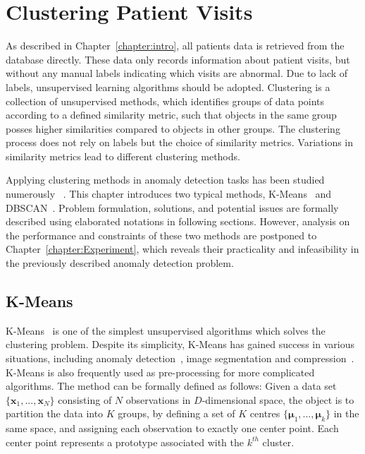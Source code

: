 \chapter{Clustering Patient Visits}
\label{chapter:clustering}

As described in Chapter~\ref{chapter:intro}, all patients data is retrieved from the database directly. These data only records information about patient visits, but without any manual labels indicating which visits are abnormal. Due to lack of labels, unsupervised learning algorithms should be adopted. Clustering is a collection of unsupervised methods, which identifies groups of data points according to a defined similarity metric, such that objects in the same group posses higher similarities compared to objects in other groups. The clustering process does not rely on labels but the choice of similarity metrics. Variations in similarity metrics lead to different clustering methods.

Applying clustering methods in anomaly detection tasks has been studied numerously~\cite{he2003discovering}
. This chapter introduces two typical methods, K-Means~\cite{lloyd1982least} and DBSCAN~\cite{ester1996density}. Problem formulation, solutions, and potential issues are formally described using elaborated notations in following sections. However, analysis on the performance and constraints of these two methods are postponed to Chapter~\ref{chapter:Experiment}, which reveals their practicality and infeasibility in the previously described anomaly detection problem.

\section{K-Means}
\label{sec:k-means}

K-Means~\cite{lloyd1982least} is one of the simplest unsupervised algorithms which solves the clustering problem. Despite its simplicity, K-Means has gained success in various situations, including anomaly detection~\cite{campello2015hierarchical}\cite{he2003discovering}, image segmentation and compression~\cite{forsyth2002computer}. K-Means is also frequently used as pre-processing for more complicated algorithms. The method can be formally defined as follows: Given a data set $\{\mathbf{x}_1, ... , \mathbf{x}_N\}$ consisting of $N$ observations in $D$-dimensional space, the object is to partition the data into $K$ groups, by defining a set of $K$ centres $\{\boldsymbol{\mu}_1, ... , \boldsymbol{\mu}_k\}$ in the same space, and assigning each observation to exactly one center point. Each center point represents a prototype associated with the $k^{th}$ cluster.

